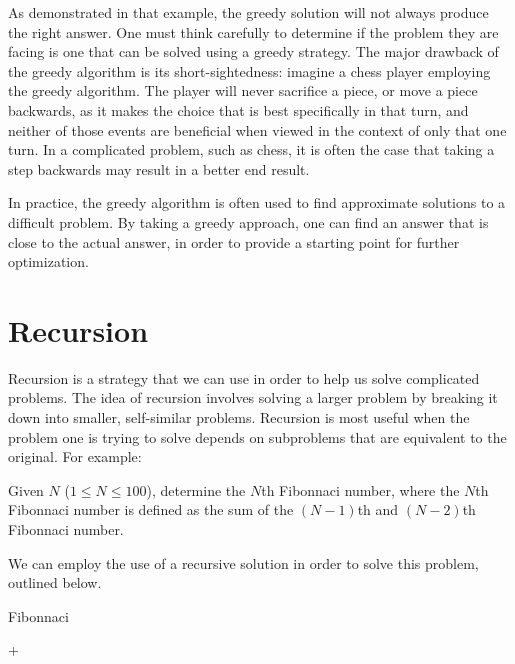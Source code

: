 As demonstrated in that example, the greedy solution will not always produce the right answer.  One must think carefully to determine if the problem they are facing is one that can be solved using a greedy strategy.  The major drawback of the greedy algorithm is its short-sightedness: imagine a chess player employing the greedy algorithm.  The player will never sacrifice a piece, or move a piece backwards, as it makes the choice that is best specifically in that turn, and neither of those events are beneficial when viewed in the context of only that one turn.  In a complicated problem, such as chess, it is often the case that taking a step backwards may result in a better end result.

In practice, the greedy algorithm is often used to find approximate solutions to a difficult problem.  By taking a greedy approach, one can find an answer that is close to the actual answer, in order to provide a starting point for further optimization.

\section{Recursion} \label{recursion}

Recursion is a strategy that we can use in order to help us solve complicated problems.  The idea of recursion involves solving a larger problem by breaking it down into smaller, self-similar problems.  Recursion is most useful when the problem one is trying to solve depends on subproblems that are equivalent to the original.  For example:

\begin{Problem}
Given $ N $ ($ 1 \leq N \leq 100 $), determine the $ N $th Fibonnaci number, where the $N$th Fibonnaci number is defined as the sum of the $(N-1)$th and $(N-2)$th Fibonnaci number. 
\end{Problem}

We can employ the use of a recursive solution in order to solve this problem, outlined below.

\begin{algorithm}[H]
\caption{Fibonnaci}
\begin{algorithmic}

        \State {}
    \Else
        \State \Return {} + 
    \EndIf
\EndFunction

\end{algorithmic}
\end{algorithm}


